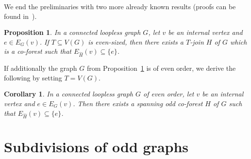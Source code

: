 \documentclass[a4paper,12pt]{article}
\newtheorem{corollary}[theorem]{Corollary}
\newtheorem{proposition}[theorem]{Proposition}
\numberwithin{equation}{section}
\begin{document}
 We end the preliminaries with two more already known results (proofs can be found in~\cite{Pet18}).

\begin{proposition}
    \label{co-forest}
In a connected loopless graph $G$, let $v$ be an internal vertex and $e\in E_G(v)$. If $T\subseteq V(G)$ is even-sized, then there exists a $T$-join $H$ of $G$ which is a co-forest such that $E_{\widehat{H}}(v)\subseteq\{e\}$.
\end{proposition}

If additionally the graph $G$ from Proposition~\ref{co-forest} is of even order, we derive the following by setting $T=V(G)$.
\begin{corollary}
    \label{odd co-forest}
   In a connected loopless graph $G$ of even order, let $v$ be an internal vertex and $e\in E_G(v)$. Then there exists a spanning odd co-forest $H$ of $G$ such that $E_{\widehat{H}}(v)\subseteq\{e\}$.

\end{corollary}


\section{Subdivisions of odd graphs}
\end{document}
